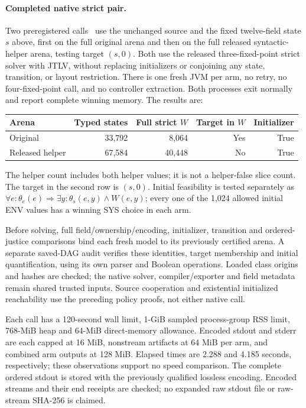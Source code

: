 \paragraph{Completed native strict pair.}
Two preregistered calls~\cite{vehicleartifact} use the unchanged source and the fixed twelve-field
state $s$ above, first on the full original arena and then on the full
released syntactic-helper arena, testing target $(s,0)$. Both use the released
 three-fixed-point strict solver with JTLV, without replacing
initializers or conjoining any state, transition, or layout restriction.
There is one fresh JVM per arm, no retry, no four-fixed-point call, and no
controller extraction. Both processes exit normally and report complete
winning memory. The results are:
\begin{center}
\begin{tabular}{@{}lrrrr@{}}\toprule
Arena & Typed states & Full strict $W$ & Target in $W$ & Initializer\\\midrule
Original & 33,792 & 8,064 & Yes & True\\
Released helper & 67,584 & 40,448 & No & True\\\bottomrule
\end{tabular}
\end{center}
The helper count includes both helper values; it is not a helper-false
slice count. The target in the second row is $(s,0)$. Initial feasibility
is tested separately as $\forall e:\theta_e(e)\Rightarrow
\exists y:\theta_s(e,y)\land W(e,y)$; every one of the 1,024 allowed
initial ENV values has a winning SYS choice in each arm.

Before solving, full field/ownership/encoding, initializer, transition and
ordered-justice comparisons bind each fresh model to its previously
certified arena. A separate saved-DAG audit verifies these identities,
target membership and initial quantification, using its own parser and
Boolean operations. Loaded class origins and hashes are checked; the
native solver, compiler/exporter and field metadata remain shared trusted
inputs. Source cooperation and existential initialized reachability use
the preceding policy proofs, not either native call.

Each call has a 120-second wall limit, 1-GiB sampled process-group RSS
limit, 768-MiB heap and 64-MiB direct-memory allowance. Encoded stdout and
stderr are each capped at 16 MiB, nonstream artifacts at 64 MiB per arm,
and combined arm outputs at 128 MiB. Elapsed times are 2.288 and 4.185
seconds, respectively; these observations support no speed comparison.
The complete ordered stdout is stored with the previously qualified
lossless encoding. Encoded streams and their end receipts are checked;
no expanded raw stdout file or raw-stream SHA-256 is claimed.

